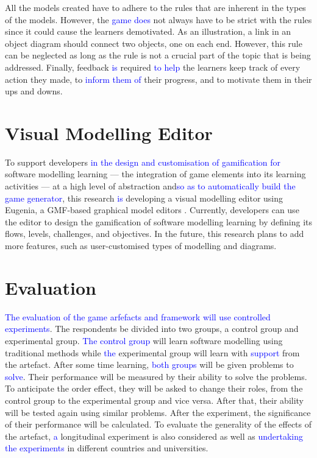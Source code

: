 \documentclass[runningheads,a4paper]{llncs}
\begin{document}
All the models created have to adhere to the rules that are inherent in the types of the models. However, the \textcolor{blue}{game does} not always have to be strict with the rules since it could cause the learners demotivated. As an illustration, a link in an object diagram should connect two objects, one on each end. However, this rule can be neglected as long as the rule is not a crucial part of the topic that is being addressed. Finally, feedback\textcolor{blue}{ is}  required \textcolor{blue}{to help} the learners keep track of every action they made, to \textcolor{blue}{inform them of } their progress, and to motivate them in their ups and downs.

\section{Visual Modelling Editor}
To support developers \textcolor{blue}{in the design and customisation of gamification for} software modelling learning --- the integration of game elements into its learning activities --- at a high level of abstraction and\textcolor{blue}{so as to automatically build the game generator}, this research \textcolor{blue}{is} developing a visual modelling editor using Eugenia, a GMF-based graphical model editors \cite{kolovos2015eugenia}. Currently, developers can use the editor to design the gamification of software modelling learning by defining its flows, levels, challenges, and objectives. In the future, this research plans to add more features, such as user-customised types of modelling and diagrams. 

\section{Evaluation}
\textcolor{blue}{The evaluation of the game arfefacts and framework will use controlled experiments}. The respondents be divided into two groups, a control group and experimental group. \textcolor{blue}{The control group} will learn software modelling using traditional methods while \textcolor{blue}{the} experimental group will learn with \textcolor{blue}{support} from the artefact. After some time learning, \textcolor{blue}{both groups} will be given problems to \textcolor{blue}{solve}. Their performance will be measured by their ability to solve the problems. To anticipate the order effect, they will be asked to change their roles, from the control group to the experimental group and vice versa. After that, their ability will be tested again using similar problems. After the experiment, the significance of their performance will be calculated. To evaluate the generality of the effects of the artefact, \textcolor{blue}{a} longitudinal experiment is also considered as well as \textcolor{blue}{undertaking the experiments} in different countries and universities.
\end{document}
